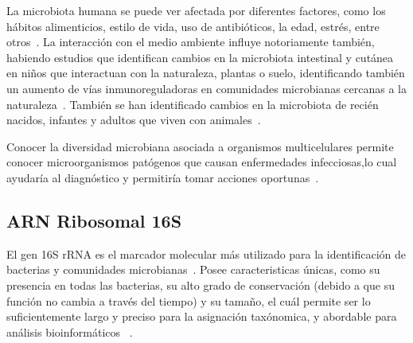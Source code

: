 La microbiota humana se puede ver afectada por diferentes factores, como los hábitos alimenticios, estilo de vida, uso de antibióticos, la edad, estrés, entre otros~\cite{altvecs2020interaction}. La interacción con el medio ambiente influye notoriamente también, habiendo estudios que identifican cambios en la microbiota intestinal y cutánea en niños que interactuan con la naturaleza, plantas o suelo, identificando también un aumento de vías inmunoreguladoras en comunidades microbianas cercanas a la naturaleza~\cite{roslund2020biodiversity}. También se han identificado cambios en la microbiota de recién nacidos, infantes y adultos que viven con animales~\cite{tun2017exposure, azad2013infant,kates2020household}.





Conocer la diversidad microbiana asociada a organismos multicelulares permite conocer microorganismos patógenos que causan enfermedades infecciosas,lo cual ayudaría al diagnóstico y permitiría tomar acciones oportunas~\cite{yan2018municipal,rackaityte2020human}. 

\subsection{ARN Ribosomal 16S}
El gen 16S rRNA es el marcador molecular más utilizado para la identificación de bacterias y comunidades microbianas~\cite{janda200716s,lopez2023determining}. Posee caracteristicas únicas, como su presencia en todas las bacterias, su alto grado de conservación (debido a que su función no cambia a través del tiempo) y su tamaño, el cuál permite ser lo suficientemente largo y preciso para la asignación taxónomica, y abordable para análisis bioinformáticos ~\cite{janda200716s, patel200116s}.

